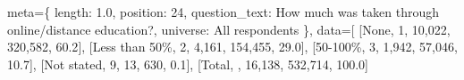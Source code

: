 \documentclass[
  11pt,
  a4paper,
]{article}
\newenvironment{Shaded}{\begin{snugshade}}{\end{snugshade}}
\newcommand{\NormalTok}[1]{\textcolor[rgb]{0.00,0.23,0.31}{#1}}
\newcommand{\OperatorTok}[1]{\textcolor[rgb]{0.37,0.37,0.37}{#1}}
\newcommand{\StringTok}[1]{\textcolor[rgb]{0.13,0.47,0.30}{#1}}
\begin{document}
\begin{Shaded}
\begin{Highlighting}[]
\NormalTok{                meta}\OperatorTok{=}\NormalTok{\{}
                    \StringTok{\textquotesingle{}length\textquotesingle{}}\NormalTok{: }\StringTok{\textquotesingle{}1.0\textquotesingle{}}\NormalTok{, }\StringTok{\textquotesingle{}position\textquotesingle{}}\NormalTok{: }\StringTok{\textquotesingle{}24\textquotesingle{}}\NormalTok{,}
                    \StringTok{\textquotesingle{}question\_text\textquotesingle{}}\NormalTok{: }\StringTok{\textquotesingle{}How much was taken through online/distance education?\textquotesingle{}}\NormalTok{,}
                    \StringTok{\textquotesingle{}universe\textquotesingle{}}\NormalTok{: }\StringTok{\textquotesingle{}All respondents\textquotesingle{}}
\NormalTok{                \},}
\NormalTok{                data}\OperatorTok{=}\NormalTok{[}
\NormalTok{                    [}\StringTok{\textquotesingle{}None\textquotesingle{}}\NormalTok{, }\StringTok{\textquotesingle{}1\textquotesingle{}}\NormalTok{, }\StringTok{\textquotesingle{}10,022\textquotesingle{}}\NormalTok{, }\StringTok{\textquotesingle{}320,582\textquotesingle{}}\NormalTok{, }\StringTok{\textquotesingle{}60.2\textquotesingle{}}\NormalTok{],}
\NormalTok{                    [}\StringTok{\textquotesingle{}Less than 50\%\textquotesingle{}}\NormalTok{, }\StringTok{\textquotesingle{}2\textquotesingle{}}\NormalTok{, }\StringTok{\textquotesingle{}4,161\textquotesingle{}}\NormalTok{, }\StringTok{\textquotesingle{}154,455\textquotesingle{}}\NormalTok{, }\StringTok{\textquotesingle{}29.0\textquotesingle{}}\NormalTok{],}
\NormalTok{                    [}\StringTok{\textquotesingle{}50{-}100\%\textquotesingle{}}\NormalTok{, }\StringTok{\textquotesingle{}3\textquotesingle{}}\NormalTok{, }\StringTok{\textquotesingle{}1,942\textquotesingle{}}\NormalTok{, }\StringTok{\textquotesingle{}57,046\textquotesingle{}}\NormalTok{, }\StringTok{\textquotesingle{}10.7\textquotesingle{}}\NormalTok{],}
\NormalTok{                    [}\StringTok{\textquotesingle{}Not stated\textquotesingle{}}\NormalTok{, }\StringTok{\textquotesingle{}9\textquotesingle{}}\NormalTok{, }\StringTok{\textquotesingle{}13\textquotesingle{}}\NormalTok{, }\StringTok{\textquotesingle{}630\textquotesingle{}}\NormalTok{, }\StringTok{\textquotesingle{}0.1\textquotesingle{}}\NormalTok{],}
\NormalTok{                    [}\StringTok{\textquotesingle{}Total\textquotesingle{}}\NormalTok{, }\StringTok{\textquotesingle{}\textquotesingle{}}\NormalTok{, }\StringTok{\textquotesingle{}16,138\textquotesingle{}}\NormalTok{, }\StringTok{\textquotesingle{}532,714\textquotesingle{}}\NormalTok{, }\StringTok{\textquotesingle{}100.0\textquotesingle{}}\NormalTok{]}

\end{Highlighting}
\end{Shaded}
\end{document}
